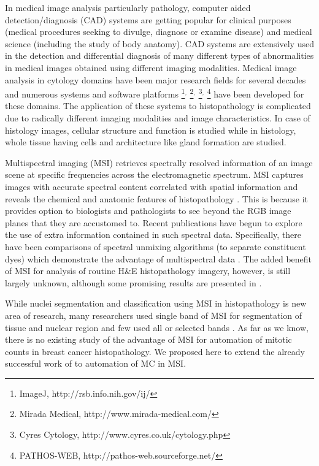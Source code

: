 \documentclass[10pt,twocolumn,letterpaper]{article}
\begin{document}
In medical image analysis particularly pathology, computer aided detection/diagnosis (CAD) systems are getting popular for clinical purposes (medical procedures seeking to divulge, diagnose or examine disease) and medical science (including the study of body anatomy). CAD systems are extensively used in the detection and differential diagnosis of many different types of abnormalities in medical images obtained using different imaging modalities. Medical image analysis in cytology domains have been major research fields for several decades and numerous systems \cite{ wolberg1993, stewart1998, cibas2009, plissiti2013, gong2013} and software platforms
\footnote{ImageJ, http://rsb.info.nih.gov/ij/}$^,$
\footnote{Mirada Medical, http://www.mirada-medical.com/}$^,$
\footnote{Cyres Cytology, http://www.cyres.co.uk/cytology.php}$^,$
\footnote{PATHOS-WEB, http://pathos-web.sourceforge.net/}
 have been developed for these domains. The application of these systems to histopathology is complicated due to radically different imaging modalities and image characteristics. In case of histology images, cellular structure and function is studied while in histology, whole tissue having cells and architecture like gland formation are studied.
 
Multispectral imaging (MSI) retrieves spectrally resolved information of an image scene at specific frequencies across the electromagnetic spectrum. MSI captures images with accurate spectral content correlated with spatial information and reveals the chemical and anatomic features of histopathology \cite{levenson2006b, levenson2008}. This is because it provides option to biologists and pathologists to see beyond the RGB image planes that they are accustomed to. Recent publications \cite{fernandez2005, levenson2006, wu2012, khelifi2012} have begun to explore the use of extra information contained in such spectral data. Specifically, there have been comparisons of spectral unmixing algorithms (to separate constituent dyes) which demonstrate the advantage of multispectral data \cite{levenson2003, gentry1999}. The added benefit of MSI for analysis of routine H\&E histopathology imagery, however, is still largely unknown, although some promising results are presented in \cite{roula2003, fernandez2005, khelifi2012, wu2012}.

While nuclei segmentation and classification using MSI in histopathology is new area of research, many researchers used single band of MSI for segmentation of tissue and nuclear region \cite{boucheron2007, wu2009, masood2009} and few used all or selected bands \cite{fernandez2005, khelifi2012}. As far as we know, there is no existing study of the advantage of MSI for automation of mitotic counts in breast cancer histopathology. We proposed here to extend the already successful work of \cite{irshad2013b} to automation of MC in MSI.
\end{document}
